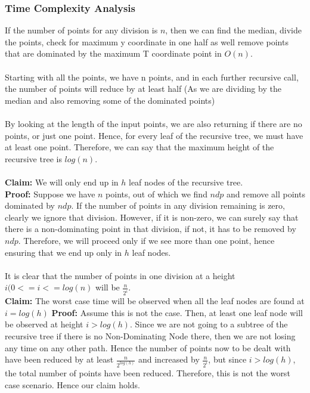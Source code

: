 \documentclass{article}
\begin{document}
        \subsubsection*{Time Complexity Analysis}
        
            If the number of points for any division is $n$, then we can find the median, divide the points, check for maximum y coordinate in one half as well remove points that are dominated by the maximum T coordinate point in $O(n)$.
            \\
            \\
            Starting with all the points, we have n points, and in each further recursive call, the number of points will reduce by at least half (As we are dividing by the median and also removing some of the dominated points)
            \\
            \\
            By looking at the length of the input points, we are also returning if there are no points, or just one point. Hence, for every leaf of the recursive tree, we must have at least one point. Therefore, we can say that the maximum height of the recursive tree is $log(n)$.
            \\
            \\
            \textbf{Claim:} We will only end up in $h$ leaf nodes of the recursive tree.
            \\
            \textbf{Proof:} Suppose we have $n$ points, out of which we find $ndp$ and remove all points dominated by $ndp$. If the number of points in any division remaining is zero, clearly we ignore that division. However, if it is non-zero, we can surely say that there is a non-dominating point in that division, if not, it has to be removed by $ndp$. Therefore, we will proceed only if we see more than one point, hence ensuring that we end up only in $h$ leaf nodes.
            \\
            \\
            It is clear that the number of points in one division at a height $i (0 <= i <= log(n)$ will be $\frac{n}{2^i}$.
            \\
            \textbf{Claim:} The worst case time will be observed when all the leaf nodes are found at $i = log(h)$
            \textbf{Proof:} Assume this is not the case. Then, at least one leaf node will be observed at height $i > log(h)$. Since we are not going to a subtree of the recursive tree if there is no Non-Dominating Node there, then we are not losing any time on any other path. Hence the number of points now to be dealt with have been reduced by at least $\frac{n}{2^{log(h)}}$ and increased by $\frac{n}{2^i}$, but since $i > log(h)$, the total number of points have been reduced. Therefore, this is not the worst case scenario. Hence our claim holds.
\end{document}
